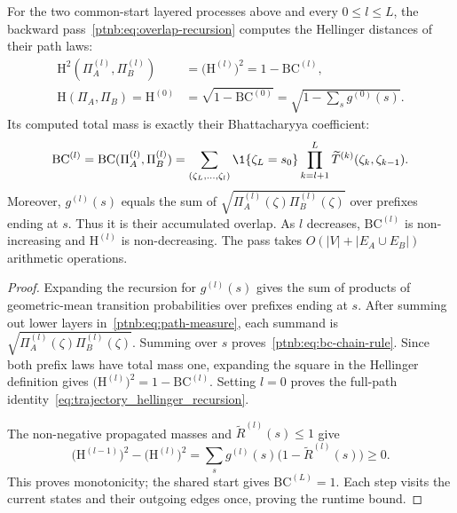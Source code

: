 \begin{theoremenv}\label{ptnb:lem:bc-chain-rule}
For the two common-start layered processes above and every $0\le l\le L$, the backward pass~\eqref{ptnb:eq:overlap-recursion} computes the Hellinger distances of their path laws:
\begin{equation}\label{eq:trajectory_hellinger_recursion}
\begin{aligned}
 \mathrm H^2(\Pi_A^{(l)},\Pi_B^{(l)})
 &=\bigl(\mathrm H^{(l)}\bigr)^2=1-\mathrm{BC}^{(l)},\\
 \mathrm H(\Pi_A,\Pi_B)=\mathrm H^{(0)}
 &=\sqrt{1-\mathrm{BC}^{(0)}}
 =\sqrt{1-\sum_sg^{(0)}(s)}.
\end{aligned}
\end{equation}
Its computed total mass is exactly their Bhattacharyya coefficient:
\begin{equation}\label{ptnb:eq:bc-chain-rule}
 \mathrm{BC}^{(l)}=\mathrm{BC}(\Pi_A^{(l)},\Pi_B^{(l)})=
 \sum_{(\zeta_L,\ldots,\zeta_l)}\1\{\zeta_L=s_0\}
 \prod_{k=l+1}^L\widetilde T^{(k)}(\zeta_k,\zeta_{k-1}).
\end{equation}
Moreover, $g^{(l)}(s)$ equals the sum of $\sqrt{\Pi_A^{(l)}(\zeta)\Pi_B^{(l)}(\zeta)}$ over prefixes ending at $s$. Thus it is their accumulated overlap. As $l$ decreases, $\mathrm{BC}^{(l)}$ is non-increasing and $\mathrm H^{(l)}$ is non-decreasing. The pass takes $O(|V|+|E_A\cup E_B|)$ arithmetic operations.
\end{theoremenv}
\begin{proof}
Expanding the recursion for $g^{(l)}(s)$ gives the sum of products of geometric-mean transition probabilities over prefixes ending at $s$. After summing out lower layers in~\eqref{ptnb:eq:path-measure}, each summand is $\sqrt{\Pi_A^{(l)}(\zeta)\Pi_B^{(l)}(\zeta)}$. Summing over $s$ proves~\eqref{ptnb:eq:bc-chain-rule}. Since both prefix laws have total mass one, expanding the square in the Hellinger definition gives $\bigl(\mathrm H^{(l)}\bigr)^2=1-\mathrm{BC}^{(l)}$. Setting $l=0$ proves the full-path identity~\eqref{eq:trajectory_hellinger_recursion}.

The non-negative propagated masses and $\widetilde R^{(l)}(s)\le1$ give
\begin{equation}\label{ptnb:eq:h2-increment}
 \bigl(\mathrm H^{(l-1)}\bigr)^2-\bigl(\mathrm H^{(l)}\bigr)^2
 =\sum_sg^{(l)}(s)\bigl(1-\widetilde R^{(l)}(s)\bigr)\ge0.
\end{equation}
This proves monotonicity; the shared start gives $\mathrm{BC}^{(L)}=1$. Each step visits the current states and their outgoing edges once, proving the runtime bound.
\end{proof}

